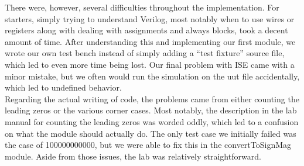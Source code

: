\documentclass{article}
\begin{document}
There were, however, several difficulties throughout the implementation.  For starters, simply trying to understand Verilog, most notably when to use wires or registers along with dealing with assignments and always blocks, took a decent amount of time.  After understanding this and implementing our first module, we wrote our own test bench instead of simply adding a ``test fixture'' source file, which led to even more time being lost.  Our final problem with ISE came with a minor mistake, but we often would run the simulation on the uut file accidentally, which led to undefined behavior.  \\

Regarding the actual writing of code, the problems came from either counting the leading zeros or the various corner cases.  Most notably, the description in the lab manual for counting the leading zeros was worded oddly, which led to a confusion on what the module should actually do.  The only test case we initially failed was the case of 100000000000, but we were able to fix this in the convertToSignMag module. Aside from those issues, the lab was relatively straightforward.  




%

%

\end{document}
